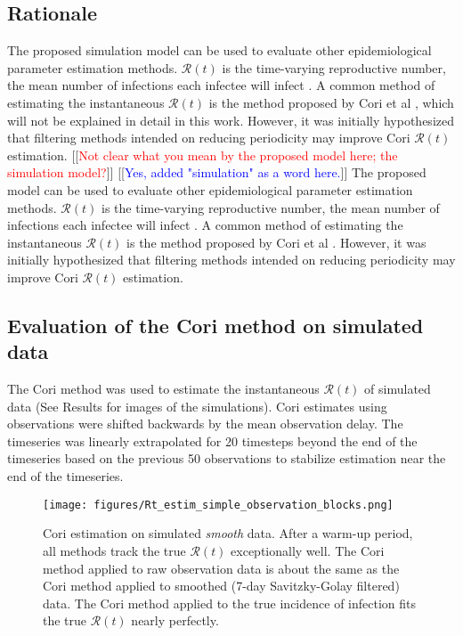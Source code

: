 \documentclass{article}
\newcommand{\nR}{\mathcal{R}}
\newcommand{\jd}[1]{[[\textcolor{red}{#1}]]}  \newcommand{\msComment}[1]{[[\textcolor{blue}{#1}]]}
\newcommand{\jd}[1]{} \newcommand{\msComment}[1]{}
\begin{document}
\subsection{Rationale}
The proposed simulation model can be used to evaluate other epidemiological parameter estimation methods. $\nR(t)$ is the time-varying reproductive number, the mean number of infections each infectee will infect \cite{Gostic}. A common method of estimating the instantaneous $\nR(t)$ is the method proposed by Cori et al \cite{Cori}, which will not be explained in detail in this work. However, it was initially hypothesized that filtering methods intended on reducing periodicity may improve Cori $\nR(t)$ estimation. 
\jd{Not clear what you mean by the proposed model here; the simulation model?} \msComment{Yes, added "simulation" as a word here.}
The proposed model can be used to evaluate other epidemiological parameter estimation methods. $\nR(t)$ is the time-varying reproductive number, the mean number of infections each infectee will infect \cite{Gostic}. A common method of estimating the instantaneous $\nR(t)$ is the method proposed by Cori et al \cite{Cori}. However, it was initially hypothesized that filtering methods intended on reducing periodicity may improve Cori $\nR(t)$ estimation. 


\subsection{Evaluation of the Cori method on simulated data}
The Cori method was used to estimate the instantaneous $\nR(t)$ of simulated data (See Results for images of the simulations). Cori estimates using observations were shifted backwards by the mean observation delay. The timeseries was linearly extrapolated for 20 timesteps beyond the end of the timeseries based on the previous 50 observations to stabilize estimation near the end of the timeseries.

\begin{figure}[h!]
\centering
\texttt{[image: figures/Rt\_estim\_simple\_observation\_blocks.png]}
\caption{Cori estimation on simulated \emph{smooth} data. After a warm-up period, all methods track the true $\nR(t)$ exceptionally well. The Cori method applied to raw observation data is about the same as the Cori method applied to smoothed (7-day Savitzky-Golay filtered) data. The Cori method applied to the true incidence of infection fits the true $\nR(t)$ nearly perfectly.}
\end{figure}
\end{document}
